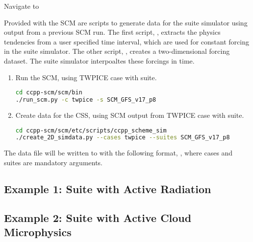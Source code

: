 Navigate to 

Provided with the SCM are scripts to generate data for the suite simulator using output from a previous SCM run. The first script, , extracts the physics tendencies from a user specified time interval, which are used for constant forcing in the suite simulator. The other script, , creates a two-dimensional forcing dataset. The suite simulator interpoaltes these forcings in time.

\begin{enumerate}
\item Run the SCM, using TWPICE case with  suite.
\begin{lstlisting}[language=bash]
cd ccpp-scm/scm/bin
./run_scm.py -c twpice -s SCM_GFS_v17_p8
\end{lstlisting}
\item Create data for the CSS, using SCM output from TWPICE case with  suite.
\begin{lstlisting}[language=bash]
cd ccpp-scm/scm/etc/scripts/ccpp_scheme_sim
./create_2D_simdata.py --cases twpice --suites SCM_GFS_v17_p8
\end{lstlisting}
\end{enumerate}

The data file will be written to  with the following format, , where cases and suites are mandatory arguments.

\subsection{Example 1: Suite with Active Radiation}

\subsection{Example 2: Suite with Active Cloud Microphysics }
